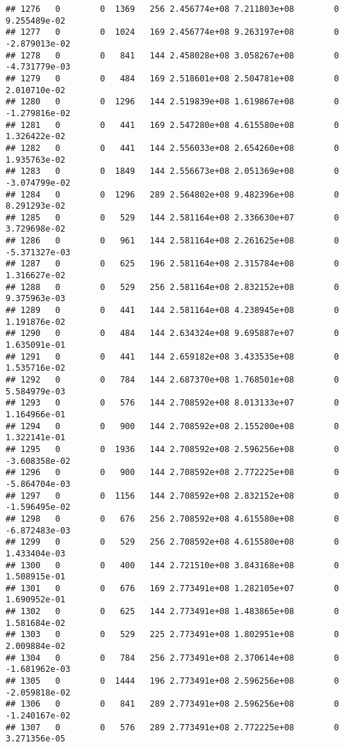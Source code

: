 \documentclass[
]{article}
\begin{document}
\begin{enumerate}
\begin{verbatim}
## 1276   0        0  1369   256 2.456774e+08 7.211803e+08        0  9.255489e-02
## 1277   0        0  1024   169 2.456774e+08 9.263197e+08        0 -2.879013e-02
## 1278   0        0   841   144 2.458028e+08 3.058267e+08        0 -4.731779e-03
## 1279   0        0   484   169 2.518601e+08 2.504781e+08        0  2.010710e-02
## 1280   0        0  1296   144 2.519839e+08 1.619867e+08        0 -1.279816e-02
## 1281   0        0   441   169 2.547280e+08 4.615580e+08        0  1.326422e-02
## 1282   0        0   441   144 2.556033e+08 2.654260e+08        0  1.935763e-02
## 1283   0        0  1849   144 2.556673e+08 2.051369e+08        0 -3.074799e-02
## 1284   0        0  1296   289 2.564802e+08 9.482396e+08        0  8.291293e-02
## 1285   0        0   529   144 2.581164e+08 2.336630e+07        0  3.729698e-02
## 1286   0        0   961   144 2.581164e+08 2.261625e+08        0 -5.371327e-03
## 1287   0        0   625   196 2.581164e+08 2.315784e+08        0  1.316627e-02
## 1288   0        0   529   256 2.581164e+08 2.832152e+08        0  9.375963e-03
## 1289   0        0   441   144 2.581164e+08 4.238945e+08        0  1.191876e-02
## 1290   0        0   484   144 2.634324e+08 9.695887e+07        0  1.635091e-01
## 1291   0        0   441   144 2.659182e+08 3.433535e+08        0  1.535716e-02
## 1292   0        0   784   144 2.687370e+08 1.768501e+08        0  5.584979e-03
## 1293   0        0   576   144 2.708592e+08 8.013133e+07        0  1.164966e-01
## 1294   0        0   900   144 2.708592e+08 2.155200e+08        0  1.322141e-01
## 1295   0        0  1936   144 2.708592e+08 2.596256e+08        0 -3.608358e-02
## 1296   0        0   900   144 2.708592e+08 2.772225e+08        0 -5.864704e-03
## 1297   0        0  1156   144 2.708592e+08 2.832152e+08        0 -1.596495e-02
## 1298   0        0   676   256 2.708592e+08 4.615580e+08        0 -6.872483e-03
## 1299   0        0   529   256 2.708592e+08 4.615580e+08        0  1.433404e-03
## 1300   0        0   400   144 2.721510e+08 3.843168e+08        0  1.508915e-01
## 1301   0        0   676   169 2.773491e+08 1.282105e+07        0  1.690952e-01
## 1302   0        0   625   144 2.773491e+08 1.483865e+08        0  1.581684e-02
## 1303   0        0   529   225 2.773491e+08 1.802951e+08        0  2.009884e-02
## 1304   0        0   784   256 2.773491e+08 2.370614e+08        0 -1.681962e-03
## 1305   0        0  1444   196 2.773491e+08 2.596256e+08        0 -2.059818e-02
## 1306   0        0   841   289 2.773491e+08 2.596256e+08        0 -1.240167e-02
## 1307   0        0   576   289 2.773491e+08 2.772225e+08        0  3.271356e-05

\end{verbatim}
\end{enumerate}
\end{document}
